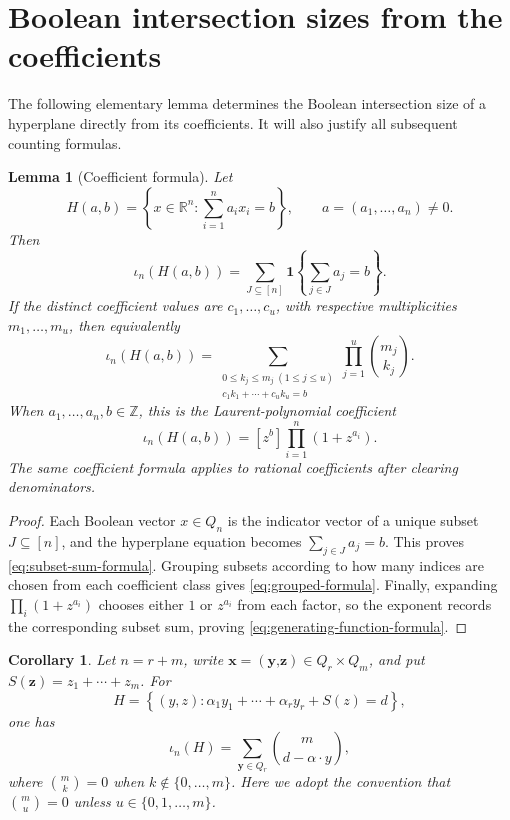 \documentclass[11pt]{article}
\newtheorem{lemma}[theorem]{Lemma}
\newtheorem{corollary}[theorem]{Corollary}
\newcommand{\Q}{Q}
\newcommand{\isect}{\iota}
\newcommand{\1}{\mathbf{1}}
\newcommand{\R}{\mathbb{R}}
\newcommand{\Z}{\mathbb{Z}}
\begin{document}
	\section{Boolean intersection sizes from the coefficients}\label{sec:intersection-formula}
	
	The following elementary lemma determines the Boolean intersection size of a hyperplane directly from its coefficients. It will also justify all subsequent counting formulas.
	
	\begin{lemma}[Coefficient formula]\label{lem:coefficient-formula}
		Let
		\[
		H(a,b)=\left\{x\in\R^n:\sum_{i=1}^n a_ix_i=b\right\},
		\qquad a=(a_1,\dots,a_n)\ne 0.
		\]
		Then
		\begin{equation}\label{eq:subset-sum-formula}
			\isect_n(H(a,b))
			=\sum_{J\subseteq[n]}\1\!\left\{\sum_{j\in J}a_j=b\right\}.
		\end{equation}
		If the distinct coefficient values are $c_1,\dots,c_u$, with respective multiplicities $m_1,\dots,m_u$, then equivalently
		\begin{equation}\label{eq:grouped-formula}
			\isect_n(H(a,b))
			=\sum_{\substack{0\le k_j\le m_j\ (1\le j\le u)\\
					c_1k_1+\cdots+c_uk_u=b}}
			\prod_{j=1}^u\binom{m_j}{k_j}.
		\end{equation}
		When $a_1,\dots,a_n,b\in\Z$, this is the Laurent-polynomial coefficient
		\begin{equation}\label{eq:generating-function-formula}
			\isect_n(H(a,b))=[z^b]\prod_{i=1}^n(1+z^{a_i}).
		\end{equation}
		The same coefficient formula applies to rational coefficients after clearing denominators.
	\end{lemma}
	
	\begin{proof}
		Each Boolean vector $x\in\Q_n$ is the indicator vector of a unique subset $J\subseteq[n]$, and the hyperplane equation becomes $\sum_{j\in J}a_j=b$. This proves \eqref{eq:subset-sum-formula}. Grouping subsets according to how many indices are chosen from each coefficient class gives \eqref{eq:grouped-formula}. Finally, expanding $\prod_i(1+z^{a_i})$ chooses either $1$ or $z^{a_i}$ from each factor, so the exponent records the corresponding subset sum, proving \eqref{eq:generating-function-formula}.
	\end{proof}
	
	\begin{corollary}\label{cor:control-tail}
		Let $n=r+m$, write $\textbf{x}=(\textbf{y,z})\in\Q_r\times\Q_m$, and put $S(\textbf{z})=z_1+\cdots+z_m$. For
		\[
		H=\left\{(y,z):\alpha_1y_1+\cdots+\alpha_ry_r+S(z)=d\right\},
		\]
		one has
		\begin{equation}\label{eq:control-tail-formula}
			\isect_n(H)=\sum_{\textbf{y}\in\Q_r}\binom{m}{d-\alpha\cdot y},
		\end{equation}
		where $\binom{m}{k}=0$ when $k\notin\{0,\dots,m\}$. Here we adopt the convention that
		\(\binom{m}{u}=0\) unless \(u\in\{0,1,\ldots,m\}\).
	\end{corollary}
	
\end{document}
